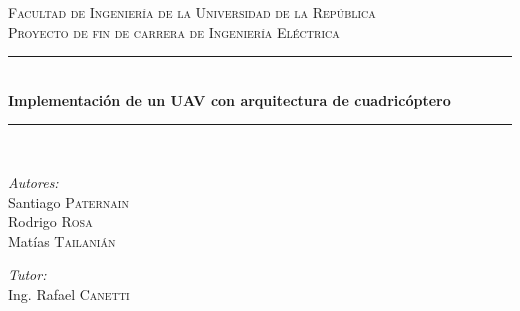 \documentclass[main]{subfiles}
\newcommand{\HRule}{\rule{\linewidth}{0.5mm}}
\begin{document}
\begin{titlepage}

\begin{center}



\textsc{\LARGE Facultad de Ingenier\'ia de la Universidad de la Rep\'ublica}\\[1.5cm]

\textsc{\Large Proyecto de fin de carrera de Ingenier\'ia El\'ectrica}\\[0.5cm]


\HRule \\[0.4cm]
{ \huge \bfseries Implementaci\'on de un UAV con arquitectura de cuadric\'optero}\\[0.4cm]

\HRule \\[1.5cm]

\begin{minipage}{0.4\textwidth}
\begin{flushleft} \large
\emph{Autores:}\\
Santiago \textsc{Paternain}\\
Rodrigo \textsc{Rosa}\\
Mat\'ias \textsc{Tailani\'an}
\end{flushleft}
\end{minipage}
\begin{minipage}{0.4\textwidth}
\begin{flushright} \large
\emph{Tutor:} \\
Ing. Rafael \textsc{Canetti}
\end{flushright}
\end{minipage}


\vfill
\begin{figure} [h!]
  \centering
  \hspace{1cm}
\hspace{1cm}
\end{figure}


\end{center}
\end{titlepage}
\end{document}

